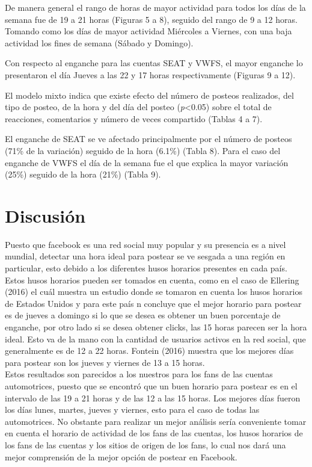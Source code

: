 \documentclass[a4paper,10pt]{article}
\begin{document}
De manera general el rango de horas de mayor actividad para todos los días
de la semana fue de 19 a 21 horas (Figuras 5 a 8), seguido del rango de 9 
a 12 horas. Tomando como los días de mayor actividad Miércoles a Viernes, 
con una baja actividad los fines de semana (Sábado y Domingo). 

Con respecto al  enganche para las cuentas SEAT y VWFS, el
mayor enganche lo presentaron el día Jueves a las 22 y 17 horas
respectivamente (Figuras 9 a 12).

El modelo mixto indica  que existe efecto del número
de posteos realizados, del tipo de posteo, de la hora y
del día del posteo (\textit{p}<0.05)  sobre el
total de reacciones, comentarios y número de veces compartido (Tablas 4 a 7).

El enganche de SEAT se ve afectado principalmente por
el número de posteos (71\% de la variación) seguido de 
la hora (6.1\%) (Tabla 8). Para el caso del enganche de VWFS el día de la
semana fue el que explica la mayor variación (25\%) seguido
de la hora (21\%) (Tabla 9).


\section{Discusión}
Puesto que facebook es una red social muy popular y su presencia es a nivel mundial, 
detectar una hora ideal para postear se ve sesgada a una región en particular, esto
debido a los diferentes husos horarios presentes en cada país.\\
Estos husos horarios pueden ser tomados en cuenta, como en el caso de Ellering (2016)
el cuál muestra un estudio donde se tomaron en cuenta los husos horarios
de Estados Unidos y para este país n concluye que el mejor horario para postear 
es de jueves a domingo si lo que  se desea es obtener un buen porcentaje de enganche, 
por otro lado si se desea obtener clicks, las 15 horas parecen ser la hora ideal.
Esto va de la mano con la cantidad de usuarios activos en la red social, 
que generalmente es de 12 a 22 horas. 
Fontein (2016) muestra que los mejores días para postear son los jueves y viernes
de 13 a 15 horas.\\
Estos resultados son parecidos a los nuestros para los fans de las cuentas
automotrices, puesto que se encontró que un buen horario para postear 
es en el intervalo de las 19 a 21 horas y de las 12 a las 15 horas. 
Los mejores días fueron los días lunes, martes, jueves y viernes,
esto para el caso de todas las automotrices. No obstante para realizar 
un mejor análisis sería conveniente tomar en cuenta el horario de actividad
de los fans de las cuentas, los husos horarios de los fans de las cuentas y
los sitios de origen de los fans, lo cual nos dará una mejor comprensión 
de la mejor opción de postear en Facebook.
\end{document}
